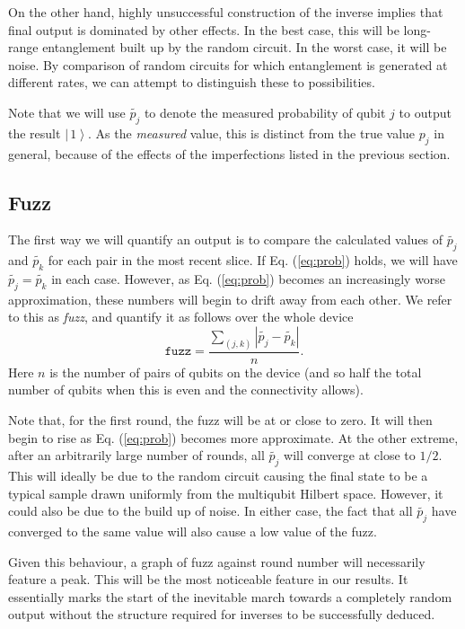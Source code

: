 \documentclass[aps,prl,twocolumn,showpacs,preprintnumbers]{revtex4-1}
\newcommand{\be}{\begin{equation}}
\newcommand{\ee}{\end{equation}}
\newcommand{\ket}[1]{\left | \, #1 \right\rangle}
\begin{document}
On the other hand, highly unsuccessful construction of the inverse implies that final output is dominated by other effects. In the best case, this will be long-range entanglement built up by the random circuit. In the worst case, it will be noise. By comparison of random circuits for which entanglement is generated at different rates, we can attempt to distinguish these to possibilities.

Note that we will use $\tilde{p_j}$ to denote the measured probability of qubit $j$ to output the result $\ket{1}$. As the \textit{measured} value, this is distinct from the true value $p_j$ in general, because of the effects of the imperfections listed in the previous section.

\subsection{Fuzz}

The first way we will quantify an output is to compare the calculated values of $\tilde{p_j}$ and $\tilde{p_k}$ for each pair in the most recent slice. If Eq. (\ref{eq:prob}) holds, we will have $\tilde{p_j}=\tilde{p_k}$ in each case. However, as Eq. (\ref{eq:prob}) becomes an increasingly worse approximation, these numbers will begin to drift away from each other. We refer to this as \textit{fuzz}, and quantify it as follows over the whole device
\be
\mathtt{fuzz} = \frac{ \sum_{(j,k)} | \tilde{p_j} - \tilde{p_k} | }{ n }.
\ee
Here $n$ is the number of pairs of qubits on the device (and so half the total number of qubits when this is even and the connectivity allows).

Note that, for the first round, the fuzz will be at or close to zero. It will then begin to rise as Eq. (\ref{eq:prob}) becomes more approximate. At the other extreme, after an arbitrarily large number of rounds, all $\tilde{p_j}$ will converge at close to $1/2$. This will ideally be due to the random circuit causing the final state to be a typical sample drawn uniformly from the multiqubit Hilbert space. However, it could also be due to the build up of noise. In either case, the fact that all $\tilde{p_j}$ have converged to the same value will also cause a low value of the fuzz.

Given this behaviour, a graph of fuzz against round number will necessarily feature a peak. This will be the most noticeable feature in our results. It essentially marks the start of the inevitable march towards a completely random output without the structure required for inverses to be successfully deduced.
\end{document}
